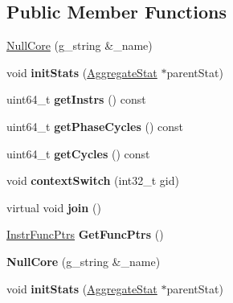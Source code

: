 \subsection*{Public Member Functions}
\begin{DoxyCompactItemize}
\item 
\hyperlink{classNullCore_a5ff75e3d1ab734fdf99a60ec3fcf339a}{Null\-Core} (g\-\_\-string \&\-\_\-name)
\item 
\hypertarget{classNullCore_a3cadc32e2edbce65f893d24468dd8bdf}{void {\bfseries init\-Stats} (\hyperlink{classAggregateStat}{Aggregate\-Stat} $\ast$parent\-Stat)}\label{classNullCore_a3cadc32e2edbce65f893d24468dd8bdf}

\item 
\hypertarget{classNullCore_ae97e480ddfaf99874fc480fc2c54cf33}{uint64\-\_\-t {\bfseries get\-Instrs} () const }\label{classNullCore_ae97e480ddfaf99874fc480fc2c54cf33}

\item 
\hypertarget{classNullCore_a76688318cc316e0e67d46ef64a61900f}{uint64\-\_\-t {\bfseries get\-Phase\-Cycles} () const }\label{classNullCore_a76688318cc316e0e67d46ef64a61900f}

\item 
\hypertarget{classNullCore_a9094cf29201bcc8e4da303c7563a7256}{uint64\-\_\-t {\bfseries get\-Cycles} () const }\label{classNullCore_a9094cf29201bcc8e4da303c7563a7256}

\item 
\hypertarget{classNullCore_a37e0ddd3bc6cfac1e6e60a8192450f1b}{void {\bfseries context\-Switch} (int32\-\_\-t gid)}\label{classNullCore_a37e0ddd3bc6cfac1e6e60a8192450f1b}

\item 
\hypertarget{classNullCore_a684c69e7e88f66642fb171c21185665f}{virtual void {\bfseries join} ()}\label{classNullCore_a684c69e7e88f66642fb171c21185665f}

\item 
\hypertarget{classNullCore_a158673562bc43cd3e25be911b212cdfb}{\hyperlink{structInstrFuncPtrs}{Instr\-Func\-Ptrs} {\bfseries Get\-Func\-Ptrs} ()}\label{classNullCore_a158673562bc43cd3e25be911b212cdfb}

\item 
\hypertarget{classNullCore_a5ff75e3d1ab734fdf99a60ec3fcf339a}{{\bfseries Null\-Core} (g\-\_\-string \&\-\_\-name)}\label{classNullCore_a5ff75e3d1ab734fdf99a60ec3fcf339a}

\item 
\hypertarget{classNullCore_a3cadc32e2edbce65f893d24468dd8bdf}{void {\bfseries init\-Stats} (\hyperlink{classAggregateStat}{Aggregate\-Stat} $\ast$parent\-Stat)}\label{classNullCore_a3cadc32e2edbce65f893d24468dd8bdf}


\end{DoxyCompactItemize}
